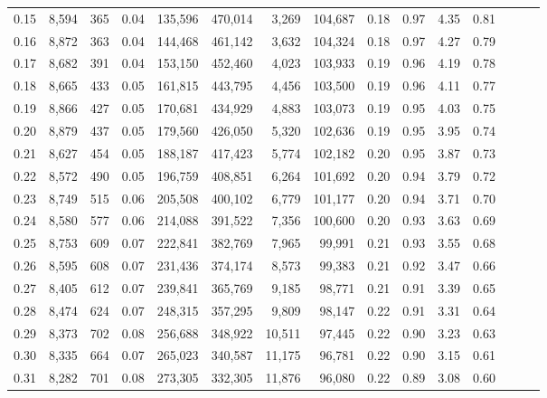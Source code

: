 \begin{tabular}{rrrrrrrrrrrrrrr}
0.15 &   8,594 &    365 &  0.04 &  135,596 &  470,014 &    3,269 &  104,687 &  0.18 &  0.97 &  4.35 &      0.81 \\
0.16 &   8,872 &    363 &  0.04 &  144,468 &  461,142 &    3,632 &  104,324 &  0.18 &  0.97 &  4.27 &      0.79 \\
0.17 &   8,682 &    391 &  0.04 &  153,150 &  452,460 &    4,023 &  103,933 &  0.19 &  0.96 &  4.19 &      0.78 \\
0.18 &   8,665 &    433 &  0.05 &  161,815 &  443,795 &    4,456 &  103,500 &  0.19 &  0.96 &  4.11 &      0.77 \\
0.19 &   8,866 &    427 &  0.05 &  170,681 &  434,929 &    4,883 &  103,073 &  0.19 &  0.95 &  4.03 &      0.75 \\
0.20 &   8,879 &    437 &  0.05 &  179,560 &  426,050 &    5,320 &  102,636 &  0.19 &  0.95 &  3.95 &      0.74 \\
0.21 &   8,627 &    454 &  0.05 &  188,187 &  417,423 &    5,774 &  102,182 &  0.20 &  0.95 &  3.87 &      0.73 \\
0.22 &   8,572 &    490 &  0.05 &  196,759 &  408,851 &    6,264 &  101,692 &  0.20 &  0.94 &  3.79 &      0.72 \\
0.23 &   8,749 &    515 &  0.06 &  205,508 &  400,102 &    6,779 &  101,177 &  0.20 &  0.94 &  3.71 &      0.70 \\
0.24 &   8,580 &    577 &  0.06 &  214,088 &  391,522 &    7,356 &  100,600 &  0.20 &  0.93 &  3.63 &      0.69 \\
0.25 &   8,753 &    609 &  0.07 &  222,841 &  382,769 &    7,965 &   99,991 &  0.21 &  0.93 &  3.55 &      0.68 \\
0.26 &   8,595 &    608 &  0.07 &  231,436 &  374,174 &    8,573 &   99,383 &  0.21 &  0.92 &  3.47 &      0.66 \\
0.27 &   8,405 &    612 &  0.07 &  239,841 &  365,769 &    9,185 &   98,771 &  0.21 &  0.91 &  3.39 &      0.65 \\
0.28 &   8,474 &    624 &  0.07 &  248,315 &  357,295 &    9,809 &   98,147 &  0.22 &  0.91 &  3.31 &      0.64 \\
0.29 &   8,373 &    702 &  0.08 &  256,688 &  348,922 &   10,511 &   97,445 &  0.22 &  0.90 &  3.23 &      0.63 \\
0.30 &   8,335 &    664 &  0.07 &  265,023 &  340,587 &   11,175 &   96,781 &  0.22 &  0.90 &  3.15 &      0.61 \\
0.31 &   8,282 &    701 &  0.08 &  273,305 &  332,305 &   11,876 &   96,080 &  0.22 &  0.89 &  3.08 &      0.60 \\

\end{tabular}
